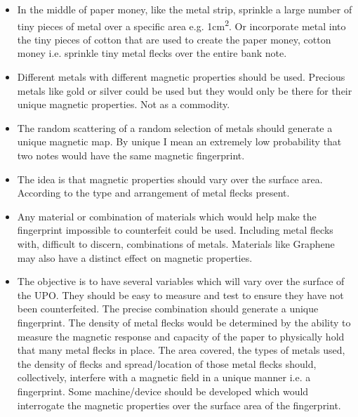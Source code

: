 \documentclass[smallextended]{svjour3}       	\smartqed  \usepackage{graphicx}
\begin{document}
\begin{itemize}
  \item In the middle of paper money, like the metal strip, sprinkle a large number of tiny pieces of metal over a specific area e.g. 1cm\textsuperscript{2}. Or incorporate metal into the tiny pieces of cotton that are used to create the paper money, cotton money i.e. sprinkle tiny metal flecks over the entire bank note.

  \item Different metals with different magnetic properties should be used. Precious metals like gold or silver could be used but they would only be there for their unique magnetic properties. Not as a commodity.

  \item The random scattering of a random selection of metals should generate a unique magnetic map. By unique I mean an extremely low probability that two notes would have the same magnetic fingerprint.

  \item The idea is that magnetic properties should vary over the surface area. According to the type and arrangement of metal flecks present.

\item Any material or combination of materials which would help make the fingerprint impossible to counterfeit could be used. Including metal flecks with, difficult to discern, combinations of metals. Materials like Graphene may also have a distinct effect on magnetic properties.


  \item The objective is to have several variables which will vary over the surface of the UPO. They should be easy to measure and test to ensure they have not been counterfeited. The precise combination should generate a unique fingerprint. The density of metal flecks would be determined by the ability to measure the magnetic response and capacity of the paper to physically hold that many metal flecks in place. The area covered, the types of metals used, the density of flecks and spread/location of those metal flecks should, collectively, interfere with a magnetic field in a unique manner i.e. a fingerprint. Some machine/device should be developed which would interrogate the magnetic properties over the surface area of the fingerprint.


\end{itemize}
\end{document}
